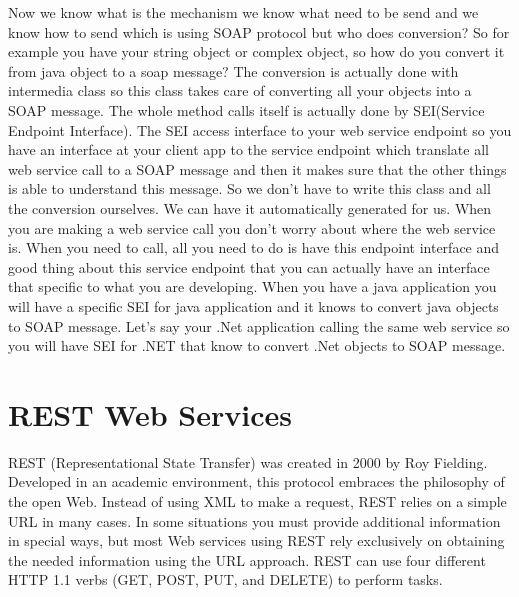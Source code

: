 Now we know what is the mechanism we know what need to be send and we know how to send which is using SOAP protocol
but who does conversion? So for example you have your string object or complex object, so how do you convert it from java
object to a soap message? The conversion is actually done with intermedia class so this class takes care of converting all
your objects into a SOAP message. The whole method calls itself is actually done by SEI(Service Endpoint Interface). The SEI access interface to your
web service endpoint so you have an interface at your client app to the service endpoint which translate all web service
call to a SOAP message and then it makes sure that the other things is able to understand this message. So we don’t have to
write this class and all the conversion ourselves. We can have it automatically generated for us. When you are making a web
service call you don’t worry about where the web service is. When you need to call, all you need to do is have this endpoint
interface and good thing about this service endpoint that you can actually have an interface that specific to what you are
developing. When you have a java application you will have a specific SEI for java application and it knows to convert java
objects to SOAP message. Let’s say your .Net application calling the same web service so you will have SEI for .NET that know
to convert .Net objects to SOAP message.\\

\section{REST Web Services}
\label{section:rest}
REST (Representational State Transfer) was created in 2000 by Roy Fielding\citep{rest:restinpractice}. Developed in an academic
environment, this protocol embraces the philosophy of the open Web. Instead of using XML to make a request, REST relies on a simple URL in many cases. In some situations you must provide
additional information in special ways, but most Web services using REST rely exclusively on obtaining the needed
information using the URL approach. REST can use four different HTTP 1.1 verbs (GET, POST, PUT, and DELETE) to
perform tasks.\\


